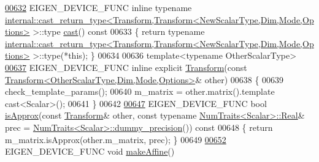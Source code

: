 \begin{DoxyCode}
\hyperlink{group___geometry___module_a4cf2dbae6e95d9efbaae83ab3308ef61}{00632}   EIGEN\_DEVICE\_FUNC \textcolor{keyword}{inline} \textcolor{keyword}{typename} 
      \hyperlink{struct_eigen_1_1internal_1_1cast__return__type}{internal::cast\_return\_type<Transform,Transform<NewScalarType,Dim,Mode,Options>}
       >::type \hyperlink{group___geometry___module_a4cf2dbae6e95d9efbaae83ab3308ef61}{cast}()\textcolor{keyword}{ const}
00633 \textcolor{keyword}{  }\{ \textcolor{keywordflow}{return} \textcolor{keyword}{typename} 
      \hyperlink{struct_eigen_1_1internal_1_1cast__return__type}{internal::cast\_return\_type<Transform,Transform<NewScalarType,Dim,Mode,Options>}
       >::type(*\textcolor{keyword}{this}); \}
00634 
00636   \textcolor{keyword}{template}<\textcolor{keyword}{typename} OtherScalarType>
\hyperlink{group___geometry___module_a2a6f70385c79d72564e9b309f636ce1d}{00637}   EIGEN\_DEVICE\_FUNC \textcolor{keyword}{inline} \textcolor{keyword}{explicit} \hyperlink{group___geometry___module_a2a6f70385c79d72564e9b309f636ce1d}{Transform}(\textcolor{keyword}{const} 
      \hyperlink{group___geometry___module_class_eigen_1_1_transform}{Transform<OtherScalarType,Dim,Mode,Options>}& other)
00638   \{
00639     check\_template\_params();
00640     m\_matrix = other.matrix().template cast<Scalar>();
00641   \}
00642 
\hyperlink{group___geometry___module_aa8aabb371eb391a0d1fa0134b34ae376}{00647}   EIGEN\_DEVICE\_FUNC \textcolor{keywordtype}{bool} \hyperlink{group___geometry___module_aa8aabb371eb391a0d1fa0134b34ae376}{isApprox}(\textcolor{keyword}{const} \hyperlink{group___geometry___module_class_eigen_1_1_transform}{Transform}& other, \textcolor{keyword}{const} \textcolor{keyword}{typename} 
      \hyperlink{group___core___module_struct_eigen_1_1_num_traits}{NumTraits<Scalar>::Real}& prec = 
      \hyperlink{group___core___module_struct_eigen_1_1_num_traits}{NumTraits<Scalar>::dummy\_precision}())\textcolor{keyword}{ const}
00648 \textcolor{keyword}{  }\{ \textcolor{keywordflow}{return} m\_matrix.isApprox(other.m\_matrix, prec); \}
00649 
\hyperlink{group___geometry___module_a18580c6c151bac89f03818164dd19632}{00652}   EIGEN\_DEVICE\_FUNC \textcolor{keywordtype}{void} \hyperlink{group___geometry___module_a18580c6c151bac89f03818164dd19632}{makeAffine}()

\end{DoxyCode}
